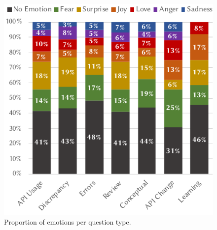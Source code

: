 \begin{figure}[th]
\centering
\includegraphics[width=.6\linewidth]{emotionproportion}
\caption[Proportions of emotions per question type]{Proportion of emotions per question type.}
\label{semotion2021:fig:emotion-dist}
\end{figure}

